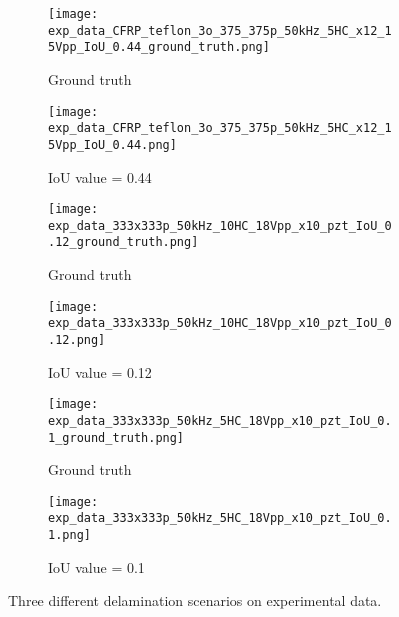 \begin{figure} [!h]
	\centering
	\begin{subfigure}[b]{0.49\textwidth}
		\centering
		\texttt{[image: exp\_data\_CFRP\_teflon\_3o\_375\_375p\_50kHz\_5HC\_x12\_15Vpp\_IoU\_0.44\_ground\_truth.png]}
		\caption{Ground truth}
		\label{fig:Figure3_a}
	\end{subfigure}
	\hfill
	\begin{subfigure}[b]{0.49\textwidth}
		\centering
		\texttt{[image: exp\_data\_CFRP\_teflon\_3o\_375\_375p\_50kHz\_5HC\_x12\_15Vpp\_IoU\_0.44.png]}
		\caption{IoU value = 0.44}
		\label{fig:Figure3_b}
	\end{subfigure}
	\hfill
	\begin{subfigure}[b]{0.49\textwidth}
		\centering
		\texttt{[image: exp\_data\_333x333p\_50kHz\_10HC\_18Vpp\_x10\_pzt\_IoU\_0.12\_ground\_truth.png]}
		\caption{Ground truth}
		\label{fig:Figure3_c}
	\end{subfigure}
	\hfill
	\begin{subfigure}[b]{0.49\textwidth}
		\centering
		\texttt{[image: exp\_data\_333x333p\_50kHz\_10HC\_18Vpp\_x10\_pzt\_IoU\_0.12.png]}
		\caption{IoU value = 0.12}
		\label{fig:Figure3_d}
	\end{subfigure}
	\hfill
	\begin{subfigure}[b]{0.49\textwidth}
		\centering
		\texttt{[image: exp\_data\_333x333p\_50kHz\_5HC\_18Vpp\_x10\_pzt\_IoU\_0.1\_ground\_truth.png]}
		\caption{Ground truth}
		\label{fig:Figure3_e}
	\end{subfigure}
	\hfill	
	\begin{subfigure}[b]{0.49\textwidth}
		\centering
		\texttt{[image: exp\_data\_333x333p\_50kHz\_5HC\_18Vpp\_x10\_pzt\_IoU\_0.1.png]}
		\caption{IoU value = 0.1}
		\label{fig:Figure3_f}
	\end{subfigure}
	\caption{Three different delamination scenarios on experimental data.}
	\label{fig:Figure3}
\end{figure} 
